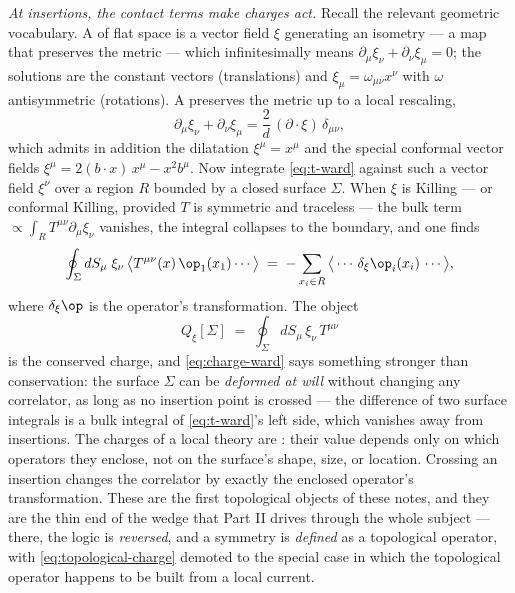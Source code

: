 \emph{At insertions, the contact terms make charges act.} Recall the
relevant geometric vocabulary. A  of flat space is a
vector field $\xi$ generating an isometry --- a map that preserves the
metric --- which infinitesimally means $\partial_\mu \xi_\nu + \partial_\nu
\xi_\mu = 0$; the solutions are the constant vectors (translations) and
$\xi_\mu = \omega_{\mu\nu} x^\nu$ with $\omega$ antisymmetric (rotations). A
 preserves the metric up to a local
rescaling,
\begin{equation}
\partial_\mu \xi_\nu + \partial_\nu \xi_\mu
= \frac{2}{d}\,(\partial\cdot\xi)\,\delta_{\mu\nu},
\label{eq:ckv}
\end{equation}
which admits in addition the dilatation $\xi^\mu = x^\mu$ and the special
conformal vector fields $\xi^\mu = 2(b\cdot x)\,x^\mu - x^2 b^\mu$. Now
integrate \eqref{eq:t-ward} against such a vector field $\xi^\nu$ over a
region $R$ bounded by a closed surface $\Sigma$. When $\xi$ is Killing ---
or conformal Killing, provided $T$ is symmetric and traceless --- the bulk
term $\propto \int_R T^{\mu\nu}\partial_\mu \xi_\nu$ vanishes, the integral
collapses to the boundary, and one finds
\begin{equation}
\oint_{\Sigma} dS_\mu \; \xi_\nu\, \big\langle T^{\mu\nu}(x)\,
\op_1(x_1)\cdots \big\rangle
\;=\; -\sum_{x_i \in R}
\big\langle \cdots\, \delta_\xi \op_i(x_i)\, \cdots \big\rangle ,
\label{eq:charge-ward}
\end{equation}
where $\delta_\xi \op$ is the operator's transformation. The object
\begin{equation}
Q_\xi[\Sigma] \;=\; \oint_\Sigma dS_\mu\, \xi_\nu \, T^{\mu\nu}
\label{eq:topological-charge}
\end{equation}
is the conserved charge, and \eqref{eq:charge-ward} says something stronger
than conservation: the surface $\Sigma$ can be \emph{deformed at will} without
changing any correlator, as long as no insertion point is crossed --- the
difference of two surface integrals is a bulk integral of
\eqref{eq:t-ward}'s left side, which vanishes away from insertions. The
charges of a local theory are : their
value depends only on which operators they enclose, not on the surface's
shape, size, or location. Crossing an insertion changes the correlator by
exactly the enclosed operator's transformation. These are the first
topological objects of these notes, and they are the thin end of the wedge
that Part II drives through the whole subject --- there, the logic is
\emph{reversed}, and a symmetry is \emph{defined} as a topological operator,
with \eqref{eq:topological-charge} demoted to the special case in which the
topological operator happens to be built from a local current.

